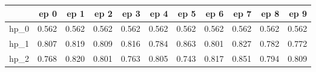 \begin{tabular}{lrrrrrrrrrr}
\toprule
{} &   ep 0 &   ep 1 &   ep 2 &   ep 3 &   ep 4 &   ep 5 &   ep 6 &   ep 7 &   ep 8 &   ep 9 \\
\midrule
hp\_0 &  0.562 &  0.562 &  0.562 &  0.562 &  0.562 &  0.562 &  0.562 &  0.562 &  0.562 &  0.562 \\
hp\_1 &  0.807 &  0.819 &  0.809 &  0.816 &  0.784 &  0.863 &  0.801 &  0.827 &  0.782 &  0.772 \\
hp\_2 &  0.768 &  0.820 &  0.801 &  0.763 &  0.805 &  0.743 &  0.817 &  0.851 &  0.794 &  0.809 \\
\bottomrule
\end{tabular}
